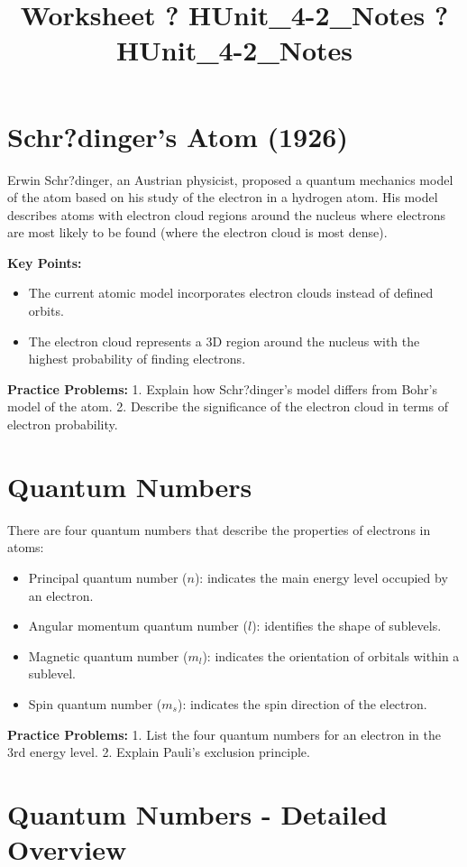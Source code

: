 \documentclass{article}
\title{Worksheet ? HUnit\_4-2\_Notes ? HUnit\_4-2\_Notes}
\author{}
\date{}
\begin{document}
\maketitle

\section*{Schr?dinger's Atom (1926)}
Erwin Schr?dinger, an Austrian physicist, proposed a quantum mechanics model of the atom based on his study of the electron in a hydrogen atom. His model describes atoms with electron cloud regions around the nucleus where electrons are most likely to be found (where the electron cloud is most dense).

\textbf{Key Points:}
\begin{itemize}
    \item The current atomic model incorporates electron clouds instead of defined orbits.
    \item The electron cloud represents a 3D region around the nucleus with the highest probability of finding electrons.
\end{itemize}

\textbf{Practice Problems:}
1. Explain how Schr?dinger's model differs from Bohr's model of the atom.
2. Describe the significance of the electron cloud in terms of electron probability.

\section*{Quantum Numbers}
There are four quantum numbers that describe the properties of electrons in atoms:
\begin{itemize}
    \item Principal quantum number ($n$): indicates the main energy level occupied by an electron.
    \item Angular momentum quantum number ($l$): identifies the shape of sublevels.
    \item Magnetic quantum number ($m_l$): indicates the orientation of orbitals within a sublevel.
    \item Spin quantum number ($m_s$): indicates the spin direction of the electron.
\end{itemize}

\textbf{Practice Problems:}
1. List the four quantum numbers for an electron in the 3rd energy level.
2. Explain Pauli's exclusion principle.

\section*{Quantum Numbers - Detailed Overview}
\end{document}
